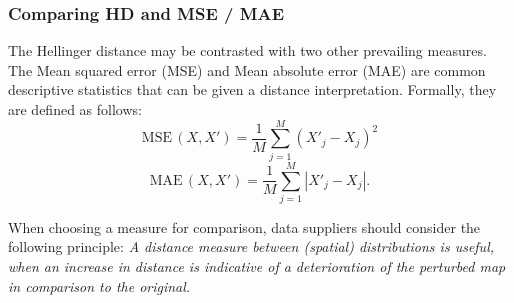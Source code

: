 \subsubsection{Comparing HD and MSE / MAE}

The Hellinger distance may be contrasted with two other prevailing measures. The Mean squared error (MSE) and Mean absolute error (MAE) are common descriptive statistics that can be given a distance interpretation.
Formally, they are defined as follows:
\begin{equation} \label{eq:util_mse}
\mathrm{MSE}\,(X, X') = \frac{1}{M} \sum_{j=1}^M \left(X'_j - X_j\right)^2
\end{equation}
\begin{equation} \label{eq:util_mae}
\mathrm{MAE}\,(X, X') = \frac{1}{M} \sum_{j=1}^M \left| X'_j - X_j \right|.
\end{equation}

When choosing a measure for comparison, data suppliers should consider the following principle:
\textit{A distance measure between (spatial) distributions is useful, when an increase in distance is indicative of a deterioration of the perturbed map in comparison to the original.}\\

